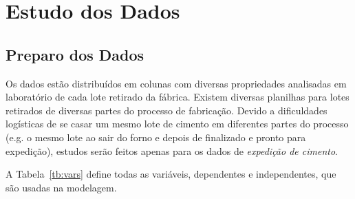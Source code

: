 \chapter{Estudo dos Dados}
\label{cap:estudodados}


\section{Preparo dos Dados}


Os dados estão distribuídos em colunas com diversas propriedades analisadas em
laboratório de cada lote retirado da fábrica. Existem diversas planilhas para
lotes retirados de diversas partes do processo de fabricação. Devido a dificuldades logísticas de se casar um
mesmo lote de cimento em diferentes partes do processo (e.g. o mesmo lote ao
sair do forno e depois de finalizado e pronto para expedição), estudos serão feitos apenas para os dados de
\textit{expedição de cimento}. 

A Tabela~\ref{tb:vars} define todas as variáveis, dependentes e independentes,
que são usadas na modelagem.


\begin{table}[]
\caption{Variáveis presentes nos dados de expedição de cimento cedidos pela Intercement}
\label{tb:vars}
\end{table}

